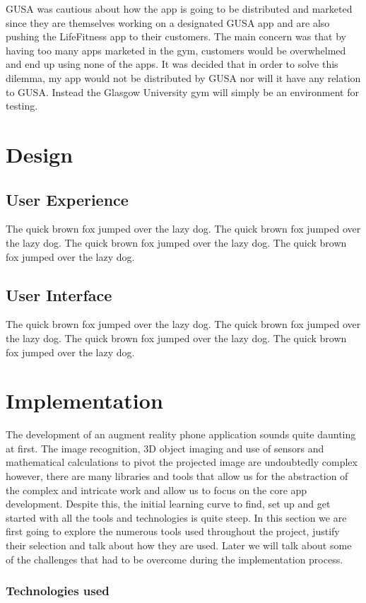 \documentclass{l4proj}
\begin{document}
GUSA was cautious about how the app is going to be distributed and marketed since they are themselves working on a designated GUSA app and are also pushing the LifeFitness app to their customers. The main concern was that by having too many apps marketed in the gym, customers would be overwhelmed and end up using none of the apps. It was decided that in order to solve this dilemma, my app would not be distributed by GUSA nor will it have any relation to GUSA. Instead the Glasgow University gym will simply be an environment for testing. 


\chapter{Design}
\section{User Experience}
The quick brown fox jumped over the lazy dog.
The quick brown fox jumped over the lazy dog.
The quick brown fox jumped over the lazy dog.
The quick brown fox jumped over the lazy dog.
\section{User Interface}
The quick brown fox jumped over the lazy dog.
The quick brown fox jumped over the lazy dog.
The quick brown fox jumped over the lazy dog.
The quick brown fox jumped over the lazy dog.

\chapter{Implementation}
The development of an augment reality phone application sounds quite daunting at first. The image recognition, 3D object imaging and use of sensors and mathematical calculations to pivot the projected image are undoubtedly complex however, there are many libraries and tools that allow us for the abstraction of the complex and intricate work and allow us to focus on the core app development. Despite this, the initial learning curve to find, set up and get started with all the tools and technologies is quite steep. In this section we are first going to explore the numerous tools used throughout the project, justify their selection and talk about how they are used. Later we will talk about some of the challenges that had to be overcome during the implementation process. 
\subsection{Technologies used}
\end{document}
